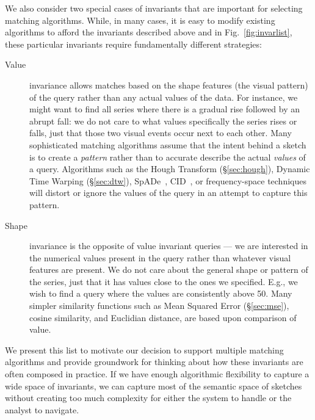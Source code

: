 We also consider two special cases of invariants that are important for selecting matching algorithms. While, in many cases, it is easy to modify existing algorithms to afford the invariants described above and in Fig.~\ref{fig:invarlist}, these particular invariants require fundamentally different strategies:
\begin{description}
	\item[Value] invariance allows matches based on the shape features (the visual pattern) of the query rather than any actual values of the data. For instance, we might want to find all series where there is a gradual rise followed by an abrupt fall: we do not care to what values specifically the series rises or falls, just that those two visual events occur next to each other. Many sophisticated matching algorithms assume that the intent behind a sketch is to create a \emph{pattern} rather than to accurate describe the actual \emph{values} of a query. Algorithms such as the Hough Transform (\S\ref{sec:hough}), Dynamic Time Warping (\S\ref{sec:dtw}), SpADe~\cite{chen2007spade}, CID~\cite{batista2011complexity}, or frequency-space techniques~\cite{chan1999efficient}  will distort or ignore the values of the query in an attempt to capture this pattern.
	\item[Shape] invariance is the opposite of value invariant queries --- we are interested in the numerical values present in the query rather than whatever visual features are present. We do not care about the general shape or pattern of the series, just that it has values close to the ones we specified. E.g., we wish to find a query where the values are consistently above 50. Many simpler similarity functions such as Mean Squared Error (\S\ref{sec:mse}), cosine similarity, and Euclidian distance, are based upon comparison of value.
\end{description}

We present this list to motivate our decision to support multiple matching algorithms and provide groundwork for thinking about how these invariants are often composed in practice. If we have enough algorithmic flexibility to capture a wide space of invariants, we can capture most of the semantic space of sketches without creating too much complexity for either the system to handle or the analyst to navigate. 

